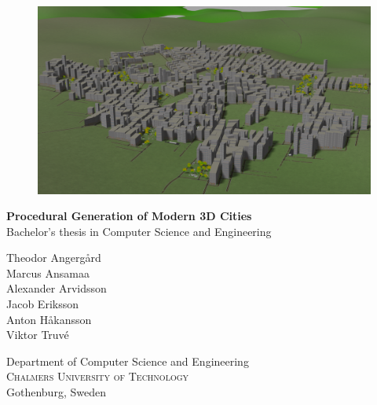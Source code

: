 \begin{titlepage}

  \begin{figure}[H]
    \centering
    \vspace{2cm}	%
    \includegraphics[width=1\linewidth]{figure/cover.png}
  \end{figure}

  \renewcommand{\familydefault}{\sfdefault} \normalfont %
  \textbf{{\Huge Procedural Generation of Modern 3D Cities}} 	\\[0.5cm]
  Bachelor's thesis in Computer Science and Engineering \setlength{\parskip}{1cm}

  {\Large
    Theodor Angergård \\[0.1cm]
    Marcus Ansamaa \\[0.1cm]
    Alexander Arvidsson \\[0.1cm]
    Jacob Eriksson \\[0.1cm]
    Anton Håkansson \\[0.1cm]
    Viktor Truvé \\[0.1cm]
  }

  Department of Computer Science and Engineering \\
  \textsc{Chalmers University of Technology} \\
  Gothenburg, Sweden \the\year

  \renewcommand{\familydefault}{\rmdefault} \normalfont %
  \vfill	
\end{titlepage}

\newpage
\restoregeometry
\thispagestyle{empty}
\mbox{}


